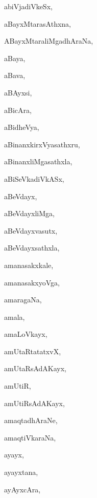 \begin{multicols}{3}
{\noindent
{abiVjadiVkeSx}, \pageref{abiVjadiVkeSx}

\noindent
{aBayxMtarasAthxna}, \pageref{aBayxMtarasAthxna}

\bigskip
\noindent
{}
\smallskip

\noindent
{ABayxMtaraliMgadhAraNa}, \pageref{ABayxMtaraliMgadhAraNa}

\noindent
{aBaya}, \pageref{aBaya}

\noindent
{aBava}, \pageref{aBava}

\noindent
{aBAyxsi}, \pageref{aBAyxsi}

\noindent
{aBicAra}, \pageref{aBicAra}

\noindent
{aBidheVya}, \pageref{aBidheVya}

\noindent
{aBinanxkirxVyasathxru}, \pageref{aBinanxkirxVyasathxru}

\noindent
{aBinanxliMgasathxla}, \pageref{aBinanxliMgasathxla}

\noindent
{aBiSeVkadiVkASx}, \pageref{aBiSeVkadiVkASx}

\noindent
{aBeVdayx}, \pageref{aBeVdayx}

\noindent
{aBeVdayxliMga}, \pageref{aBeVdayxliMga}

\noindent
{aBeVdayxvasutx}, \pageref{aBeVdayxvasutx}

\noindent
{aBeVdayxsathxla}, \pageref{aBeVdayxsathxla}

\noindent
{amanasakxkale}, \pageref{amanasakxkale}

\noindent
{amanasakxyoVga}, \pageref{amanasakxyoVga}

\noindent
{amaragaNa}, \pageref{amaragaNa}

\noindent
{amala}, \pageref{amala}

\noindent
{amaLoVkayx}, \pageref{amaLoVkayx}

\noindent
{amUtaRtatatxvX}, \pageref{amUtaRtatatxvX}

\noindent
{amUtaRsAdAKayx}, \pageref{amUtaRsAdAKayx}

\noindent
{amUtiR}, \pageref{amUtiR}

\noindent
{amUtiRsAdAKayx}, \pageref{amUtiRsAdAKayx}

\noindent
{amaqtadhAraNe}, \pageref{amaqtadhAraNe}

\noindent
{amaqtiVkaraNa}, \pageref{amaqtiVkaraNa}

\noindent
{ayayx}, \pageref{ayayx}

\noindent
{ayayxtana}, \pageref{ayayxtana}

\noindent
{ayAyxcAra}, \pageref{ayAyxcAra}

}
\end{multicols}
